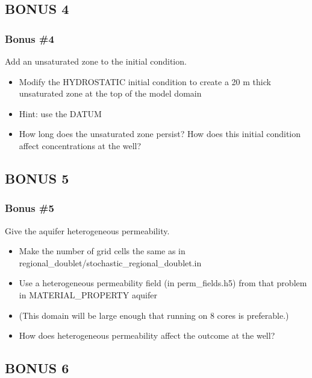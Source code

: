 \documentclass{beamer}
\begin{document}
\subsection{BONUS 4}

\begin{frame}[fragile]\frametitle{Bonus \#4}
Add an unsaturated zone to the initial condition.

\begin{itemize}
  \item Modify the HYDROSTATIC initial condition to create a 20 m thick unsaturated zone at the top of the model domain
  \item Hint: use the DATUM
  \item How long does the unsaturated zone persist? How does this initial condition affect concentrations at the well?
\end{itemize}

\end{frame}

\subsection{BONUS 5}

\begin{frame}[fragile]\frametitle{Bonus \#5}
Give the aquifer heterogeneous permeability.

\begin{itemize}
  \item Make the number of grid cells the same as in regional\_doublet/stochastic\_regional\_doublet.in
  \item Use a heterogeneous permeability field (in perm\_fields.h5) from that problem in MATERIAL\_PROPERTY aquifer
  \item (This domain will be large enough that running on 8 cores is preferable.)
  \item How does heterogeneous permeability affect the outcome at the well?
\end{itemize}

\end{frame}

\subsection{BONUS 6}
\end{document}
